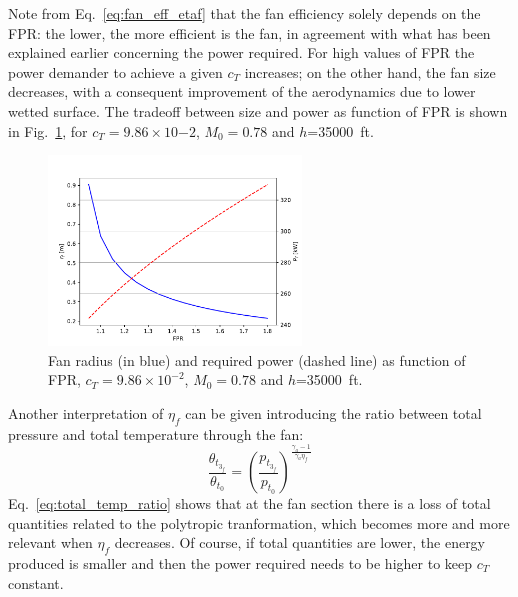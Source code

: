 Note from Eq.~\eqref{eq:fan_eff_etaf} that the fan efficiency solely depends on the FPR: the lower, the more efficient is the fan, in agreement with what has been explained earlier concerning the power required.
For high values of FPR the power demander to achieve a given $c_T$ increases; on the other hand, the fan size decreases, with a consequent improvement of the aerodynamics due to lower wetted surface.
The tradeoff between size and power as function of FPR is shown in Fig.~\ref{fig:rfan_preq_comp}, for $c_T=9.86\times10{-2}$, $M_0=0.78$ and $h$=35000~ft. 
\begin{figure}[!h]
	\centering
	\includegraphics[keepaspectratio, width=0.6\textwidth]{images/chap3/fan_param_tradeoff}
	\caption{Fan radius (in blue) and required power (dashed line) as function of FPR, $c_T=9.86\times10^{-2}$, $M_0=0.78$ and $h$=35000~ft.}
	\label{fig:rfan_preq_comp}
\end{figure}

Another interpretation of $\eta_f$ can be given introducing the ratio between total pressure and total temperature through the fan: 
\begin{equation}
	\label{eq:total_temp_ratio}
	\frac{\theta_{t_{3_{f}}}}{\theta_{t_{0}}}=\left(\frac{p_{t_{3_{f}}}}{p_{t_{0}}}\right)^{\frac{\gamma_a-1}{\gamma_a \eta_f}}
\end{equation}
Eq.~\ref{eq:total_temp_ratio} shows that at the fan section there is a loss of total quantities related to the polytropic tranformation, which becomes more and more relevant when $\eta_f$ decreases.
Of course, if total quantities are lower, the energy produced is smaller and then the power required needs to be higher to keep $c_T$ constant.

